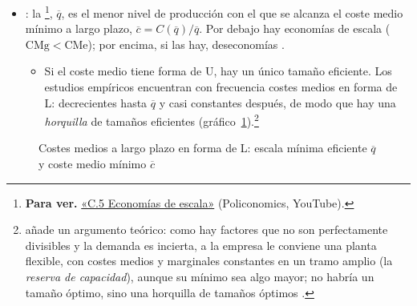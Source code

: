\documentclass[11pt]{article}
\begin{document}
\begin{itemize}
\item {}: la \footnote{\textbf{Para ver.} \href{https://www.youtube.com/watch?v=pNx4n6IGy1g}{«C.5 Economías de escala»} (Policonomics, YouTube).}, $\overline{q}$, es el menor nivel de producción con el que se alcanza el coste medio mínimo a largo plazo, $\overline{c}=C(\overline{q})/\overline{q}$. Por debajo hay economías de escala ($\mathrm{CMg}<\mathrm{CMe}$); por encima, si las hay, deseconomías .
  \begin{itemize}
  \item Si el coste medio tiene forma de U, hay un único tamaño eficiente. Los estudios empíricos encuentran con frecuencia costes medios en forma de L: decrecientes hasta $\overline{q}$ y casi constantes después, de modo que hay una \emph{horquilla} de tamaños eficientes (gráfico~\ref{fig:costes-l})\nocite{Bain1956Barriers,Stigler1958Economies}.\footnote{\textcite{Stigler1939Production} añade un argumento teórico: como hay factores que no son perfectamente divisibles y la demanda es incierta, a la empresa le conviene una planta flexible, con costes medios y marginales constantes en un tramo amplio (la \emph{reserva de capacidad}), aunque su mínimo sea algo mayor; no habría un tamaño óptimo, sino una horquilla de tamaños óptimos .}
  \end{itemize}
\end{itemize}

\begin{figure}[H]
\centering
\caption{Costes medios a largo plazo en forma de L: escala mínima eficiente $\overline{q}$ y coste medio mínimo $\overline{c}$}\label{fig:costes-l}
\end{figure}
\end{document}
